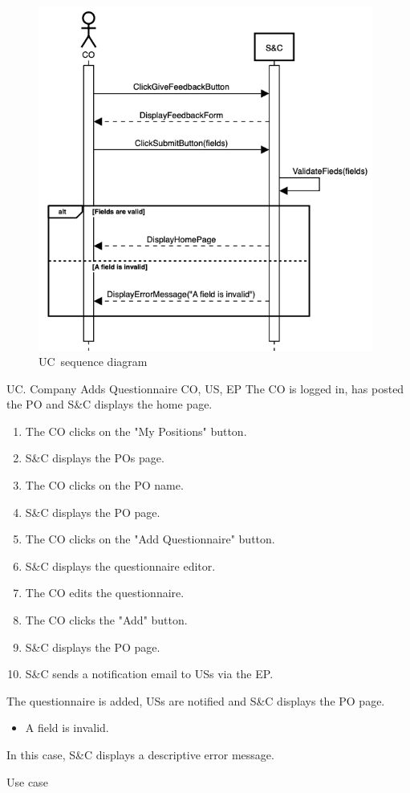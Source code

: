 \begin{figure}[h]
    \centering
    \includegraphics[width=11cm]{images/sequence-diagrams/company-fills-out-feedback-form.png}
    \caption{UC\theuc\ sequence diagram}
\end{figure}


\clearpage
\begin{usecase}
    {UC\theuc. Company Adds Questionnaire}
    {CO, US, EP}
    {The CO is logged in, has posted the PO and S\&C displays the home page.}
    {\begin{enumerate}[leftmargin=*]
        \item The CO clicks on the "My Positions" button.
        \item S\&C displays the POs page.
        \item The CO clicks on the PO name.
        \item S\&C displays the PO page.
        \item The CO clicks on the "Add Questionnaire" button.
        \item S\&C displays the questionnaire editor.
        \item The CO edits the questionnaire.
        \item The CO clicks the "Add" button.
        \item S\&C displays the PO page.
        \item S\&C sends a notification email to USs via the EP.
    \end{enumerate}}
    {The questionnaire is added, USs are notified and S\&C displays the PO page.}
    {\begin{itemize}[leftmargin=*, label=\tiny\textbullet]
        \item A field is invalid.
    \end{itemize}
    In this case, S\&C displays a descriptive error message.}
    {Use case \theuc}
\end{usecase}

